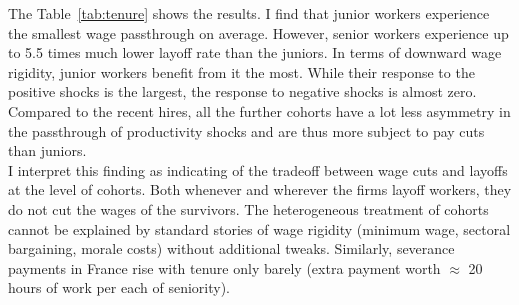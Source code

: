 The Table~\ref{tab:tenure} shows the results. %
I find that junior workers experience the smallest wage passthrough on average. However, senior workers experience up to 5.5 times much lower layoff rate than the juniors. In terms of downward wage rigidity, junior workers benefit from it the most. While their response to the positive shocks is the largest, the response to negative shocks is almost zero. Compared to the recent hires, all the further cohorts have a lot less asymmetry in the passthrough of productivity shocks and are thus more subject to pay cuts than juniors. \\ 
I interpret this finding as indicating of the tradeoff between wage cuts and layoffs at the level of cohorts. Both whenever and wherever the firms layoff workers, they do not cut the wages of the survivors.
The heterogeneous treatment of cohorts cannot be explained by standard stories of wage rigidity (minimum wage, sectoral bargaining, morale costs) without additional tweaks. Similarly, severance payments in France rise with tenure only barely (extra payment worth $\approx$ 20 hours of work per each of seniority). 


